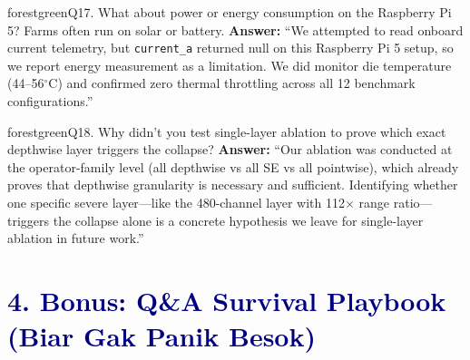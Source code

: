 \documentclass[10pt,a4paper]{article}
\begin{document}
\begin{qabox}{forestgreen}{Q17. What about power or energy consumption on the Raspberry Pi 5? Farms often run on solar or battery.}
\textbf{Answer:}
``We attempted to read onboard current telemetry, but \texttt{current\_a} returned null on this Raspberry Pi 5 setup, so we report energy measurement as a limitation. We did monitor die temperature (44--56$^\circ$C) and confirmed zero thermal throttling across all 12 benchmark configurations.''
\end{qabox}

\begin{qabox}{forestgreen}{Q18. Why didn't you test single-layer ablation to prove which exact depthwise layer triggers the collapse?}
\textbf{Answer:}
``Our ablation was conducted at the operator-family level (all depthwise vs all SE vs all pointwise), which already proves that depthwise granularity is necessary and sufficient. Identifying whether one specific severe layer---like the 480-channel layer with 112$\times$ range ratio---triggers the collapse alone is a concrete hypothesis we leave for single-layer ablation in future work.''
\end{qabox}

\section*{\textcolor{navy}{4. Bonus: Q\&A Survival Playbook (Biar Gak Panik Besok)}}
\end{document}
